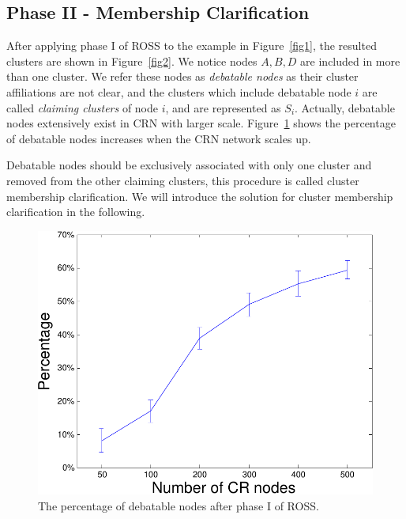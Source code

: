\documentclass[10pt,journal,compsoc]{IEEEtran}
\theoremstyle{mytheoremstyle}
\theoremstyle{mytheoremstyle}
\theoremstyle{mytheoremstyle}
\begin{document}
\subsection{Phase II - Membership Clarification}
After applying phase I of ROSS to the example in Figure~\ref{fig1}, the resulted clusters are shown in Figure~\ref{fig2}.
We notice nodes $A, B, D$ are included in more than one cluster. 
We refer these nodes as \textit{debatable nodes} as their cluster affiliations are not clear, and the clusters which include debatable node $i$ are called \textit{claiming clusters} of node $i$, and are represented as $S_i$.  
Actually, debatable nodes extensively exist in CRN with larger scale.
Figure~\ref{percentage_overlapping_node} shows the percentage of debatable nodes increases when the CRN network scales up.

Debatable nodes should be exclusively associated with only one cluster and removed from the other claiming clusters, this procedure is called cluster membership clarification.
We will introduce the solution for cluster membership clarification in the following.

\begin{figure}[ht!]
  \centering
  \includegraphics[width=0.7\linewidth]{percentage_overlapping_node.pdf}
  \caption{The percentage of debatable nodes after phase I of ROSS.}\label{percentage_overlapping_node}
\end{figure}




\end{document}
